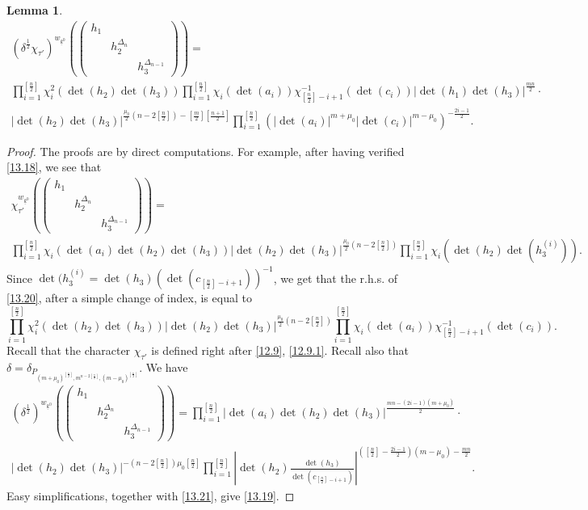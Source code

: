 \documentclass[12pts]{amsart}
\newtheorem{lem}[thm]{Lemma}
\begin{document}
\begin{lem}
\begin{multline}
(\delta^{\frac{1}{2}}\chi_{\tau'})^{w_{\underline{k}^0}}(\begin{pmatrix}h_1\\&h_2^{\Delta_n}\\&&h_3^{\Delta_{n-1}}\end{pmatrix})=\\
\prod_{i=1}^{[\frac{n}{2}]}\chi_i^2(\det(h_2)\det(h_3))\prod_{i=1}^{[\frac{n}{2}]}\chi_i(\det(a_i))\chi_{[\frac{n}{2}]-i+1}^{-1}(\det(c_i))|\det(h_1)\det(h_3)|^{\frac{mn}{2}}\cdot\\
|\det(h_2)\det(h_3)|^{\frac{\mu_0}{2}(n-2[\frac{n}{2}])-[\frac{m}{2}][\frac{n+1}{2}]}\prod_{i=1}^{[\frac{n}{2}]}(|\det(a_i)|^{m+\mu_0}|\det(c_i)|^{m-\mu_0})^{-\frac{2i-1}{2}}.
\end{multline}
\end{lem}
\begin{proof}
The proofs are by direct computations. For example, after having verified \eqref{13.18}, we see that 
\begin{multline}\label{13.20}
\chi_{\tau'}^{w_{\underline{k}^0}}(\begin{pmatrix}h_1\\&h_2^{\Delta_n}\\&&h_3^{\Delta_{n-1}}\end{pmatrix})=\\
\prod_{i=1}^{[\frac{n}{2}]}\chi_i(\det(a_i)\det(h_2)\det(h_3))|\det(h_2)\det(h_3)|^{\frac{\mu_0}{2}(n-2[\frac{n}{2}])}\prod_{i=1}^{[\frac{n}{2}]}\chi_i(\det(h_2)\det(h^{(i)}_3)).
\end{multline}
Since $\det(h^{(i)}_3=\det(h_3)(\det(c_{[\frac{n}{2}]-i+1}))^{-1}$, we get that
the r.h.s. of \eqref{13.20}, after a simple change of index, is equal to
\begin{equation}\label{13.21}	
\prod_{i=1}^{[\frac{n}{2}]}\chi_i^2(\det(h_2)\det(h_3))|\det(h_2)\det(h_3)|^{\frac{\mu_0}{2}(n-2[\frac{n}{2}])}\prod_{i=1}^{[\frac{n}{2}]}\chi_i(\det(a_i))\chi_{[\frac{n}{2}]-i+1}^{-1}(\det(c_i)).
\end{equation}
Recall that the character $\chi_{\tau'}$ is defined right after \eqref{12.9}, \eqref{12.9.1}. Recall also that $\delta=\delta_{P_{(m+\mu_0)^{[\frac{n}{2}]},m^{n-2[\frac{n}{2}]},(m-\mu_0)^{[\frac{n}{2}]}}}$. We have
\begin{multline}\nonumber
(\delta^{\frac{1}{2}})^{w_{\underline{k}^0}}(\begin{pmatrix}h_1\\&h_2^{\Delta_n}\\&&h_3^{\Delta_{n-1}}\end{pmatrix})=
\prod_{i=1}^{[\frac{n}{2}]}|\det(a_i)\det(h_2)\det(h_3)|^{\frac{mn-(2i-1)(m+\mu_0)}{2}}\cdot \\
|\det(h_2)\det(h_3)|^{-(n-2[\frac{n}{2}])\mu_0[\frac{n}{2}]}\prod_{i=1}^{[\frac{n}{2}]}|\det(h_2)\frac{\det(h_3)}{\det(c_{[\frac{n}{2}]-i+1})}|^{([\frac{n}{2}]-\frac{2i-1}{2})(m-\mu_0)-\frac{mn}{2}}.
\end{multline}
Easy simplifications, together with \eqref{13.21}, give \eqref{13.19}.	
	
\end{proof}
\end{document}
